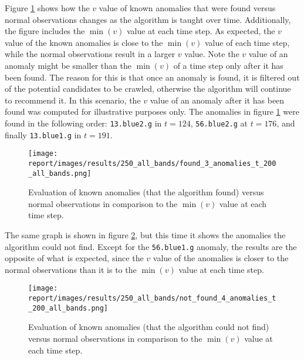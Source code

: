 Figure \ref{fig:evaluation:v-versus-t:found} shows how the $v$ value of known anomalies that were found versus normal observations changes as the \mlblink algorithm is taught over time. Additionally, the figure includes the $\min(v)$ value at each time step. As expected, the $v$ value of the known anomalies is close to the $\min(v)$ value of each time step, while the normal observations result in a larger $v$ value. Note the $v$ value of an anomaly might be smaller than the $\min(v)$ of a time step only after it has been found. The reason for this is that once an anomaly is found, it is filtered out of the potential candidates to be crawled, otherwise the \mlblink algorithm will continue to recommend it. In this scenario, the $v$ value of an anomaly after it has been found was computed for illustrative purposes only. The anomalies in figure \ref{fig:evaluation:v-versus-t:found} were found in the following order: \texttt{13.blue2.g} in $t = 124$, \texttt{56.blue2.g} at $t = 176$, and finally \texttt{13.blue1.g} in $t = 191$. \newline

\begin{figure}
  \centering
  \texttt{[image: report/images/results/250\_all\_bands/found\_3\_anomalies\_t\_200\_all\_bands.png]}
  \caption{Evaluation of known anomalies (that the \mlblink algorithm found) versus normal observations in comparison to the $\min(v)$ value at each time step.}
  \label{fig:evaluation:v-versus-t:found}
\end{figure}

The same graph is shown in figure \ref{fig:evaluation:v-versus-t:not-found}, but this time it shows the anomalies the \mlblink algorithm could not find. Except for the \texttt{56.blue1.g} anomaly, the results are the opposite of what is expected, since the $v$ value of the anomalies is closer to the normal observations than it is to the $\min(v)$ value at each time step. \newline

\begin{figure}
  \centering
  \texttt{[image: report/images/results/250\_all\_bands/not\_found\_4\_anomalies\_t\_200\_all\_bands.png]}
  \caption{Evaluation of known anomalies (that the \mlblink algorithm could not find) versus normal observations in comparison to the $\min(v)$ value at each time step.}
  \label{fig:evaluation:v-versus-t:not-found}
\end{figure}

